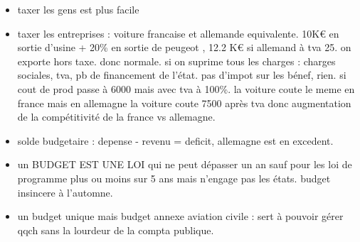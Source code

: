 \documentclass[a4paper,12pt]{article}
\begin{document}
\begin{itemize}
	\item taxer les gens est plus facile
	\item taxer les entreprises : voiture francaise et allemande equivalente.
	10K€ en sortie d'usine + 20\% en sortie de peugeot , 12.2 K€ si allemand à tva 25.
	on exporte hors taxe. donc normale. si on suprime tous les charges : charges sociales, tva,
	pb de financement de l'état. pas d'impot sur les bénef, rien. si cout de prod passe à 6000 mais avec tva à 100\%.
	la voiture coute le meme en france mais en allemagne la voiture coute 7500 après tva donc augmentation
	de la compétitivité de la france vs allemagne.
	\item solde budgetaire : depense - revenu = deficit, allemagne est en excedent.
	\item un BUDGET EST UNE LOI qui ne peut dépasser un an sauf pour les loi de programme plus ou moins sur 5 ans
	mais n'engage pas les états. budget insincere à l'automne.
	\item un budget unique mais budget annexe aviation civile : sert à pouvoir gérer qqch sans la lourdeur
	de la compta publique.
\end{itemize}
 

%

%
%

\newpage
\nocite{*}  %


%
%
%
%
\end{document}
